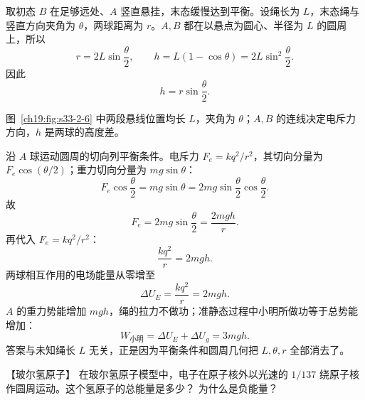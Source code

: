 \begin{xesolution}
取初态 $B$ 在足够远处、$A$ 竖直悬挂，末态缓慢达到平衡。设绳长为 $L$，末态绳与竖直方向夹角为
$\theta$，两球距离为 $r$。$A,B$ 都在以悬点为圆心、半径为 $L$ 的圆周上，所以
\[
  r=2L\sin\frac\theta2,
  \qquad h=L(1-\cos\theta)=2L\sin^2\frac\theta2.
\]
因此
\[
  \boxed{h=r\sin\frac\theta2}.
\]

图~\ref{ch19:fig:s33-2-6} 中两段悬线位置均长 $L$，夹角为 $\theta$；$A,B$ 的连线决定电斥力方向，$h$ 是两球的高度差。

\par\noindent\begin{minipage}{\linewidth}
\repellingSpheresFigure
{}\label{ch19:fig:s33-2-6}
\end{minipage}\par\medskip

沿 $A$ 球运动圆周的切向列平衡条件。电斥力
$F_e=kq^2/r^2$，其切向分量为 $F_e\cos(\theta/2)$；重力切向分量为 $mg\sin\theta$：
\[
  F_e\cos\frac\theta2=mg\sin\theta
  =2mg\sin\frac\theta2\cos\frac\theta2.
\]
故
\[
  F_e=2mg\sin\frac\theta2=\frac{2mgh}{r}.
\]
再代入 $F_e=kq^2/r^2$：
\[
  \frac{kq^2}{r}=2mgh.
\]
两球相互作用的电场能量从零增至
\[
  \boxed{\Delta U_E=\frac{kq^2}{r}=2mgh}.
\]
$A$ 的重力势能增加 $mgh$，绳的拉力不做功；准静态过程中小明所做功等于总势能增加：
\[
  \boxed{W_{\text{小明}}=\Delta U_E+\Delta U_g=3mgh}.
\]
答案与未知绳长 $L$ 无关，正是因为平衡条件和圆周几何把 $L,\theta,r$ 全部消去了。
\end{xesolution}



\begin{origexamplebox}{【玻尔氢原子】}\label{ch19:ex:s33-2-8}
在玻尔氢原子模型中，电子在原子核外以光速的 $1/137$ 绕原子核作圆周运动。这个氢原子的总能量是多少？
为什么是负能量？

\ThQBohr
\end{origexamplebox}\par\nopagebreak[4]

